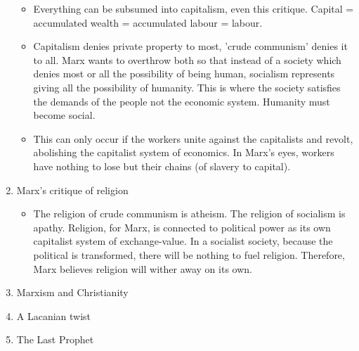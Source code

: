 \begin{enumerate}
\begin{itemize}
		\item Everything can be subsumed into capitalism, even this critique. Capital = accumulated wealth = accumulated labour = labour.
		\item Capitalism denies private property to most, 'crude communism' denies it to all. Marx wants to overthrow both so that instead of a society which denies most or all the possibility of being human, socialism represents giving all the possibility of humanity. This is where the society satisfies the demands of the people not the economic system. Humanity must become social.
		\item This can only occur if the workers unite against the capitalists and revolt, abolishing the capitalist system of economics. In Marx's eyes, workers have nothing to lose but their chains (of slavery to capital).
	\end{itemize}
 	\item Marx's critique of religion
	\begin{itemize}
		\item The religion of crude communism is atheism. The religion of socialism is apathy. Religion, for Marx, is connected to political power as its own capitalist system of exchange-value. In a socialist society, because the political is transformed, there will be nothing to fuel religion. Therefore, Marx believes religion will wither away on its own.
	\end{itemize}
 	\item Marxism and Christianity
	 \item A Lacanian twist
 	\item The Last Prophet
\end{enumerate}
